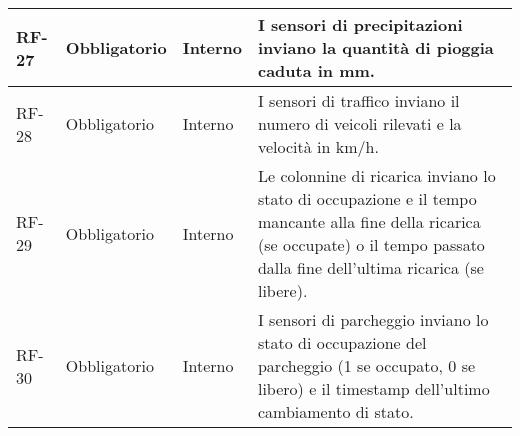 \begin{longtable}{|>{\centering\arraybackslash}m{}|>{\centering\arraybackslash}m{}|>{\centering\arraybackslash}m{}|>{\centering\arraybackslash}m{}|}
	RF-27           & Obbligatorio        & Interno                                                                                                           & I sensori di precipitazioni inviano la quantità di pioggia caduta in mm.                                                                                                                                                                                                                                                                                                                                                                                                                             \\\hline
	RF-28           & Obbligatorio        & Interno                                                                                                           & I sensori di traffico inviano il numero di veicoli rilevati e la velocità in km/h.                                                                                                                                                                                                                                                                                                                                                                                                                   \\\hline
	RF-29           & Obbligatorio        & Interno                                                                                                           & Le colonnine di ricarica inviano lo stato di occupazione e il tempo mancante alla fine della ricarica (se occupate) o il tempo passato dalla fine dell'ultima ricarica (se libere).                                                                                                                                                                                                                                                                                                                  \\\hline
	RF-30           & Obbligatorio        & Interno                                                                                                           & I sensori di parcheggio inviano lo stato di occupazione del parcheggio (1 se occupato, 0 se libero) e il timestamp dell'ultimo cambiamento di stato.                                                                                                                                                                                                                                                                                                                                                 \\\hline

\end{longtable}
